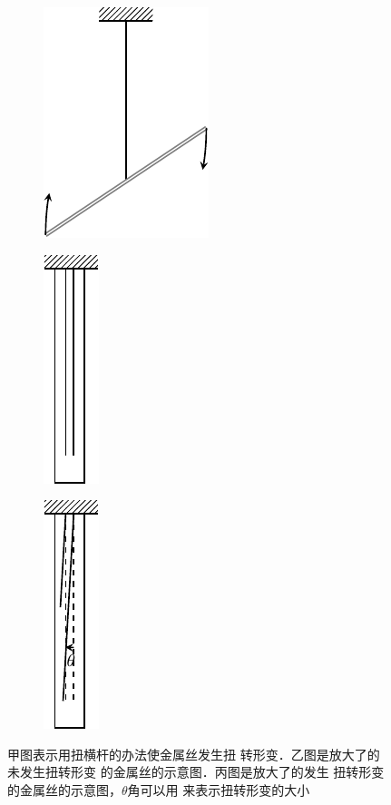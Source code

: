 \begin{figure} [htp]\centering
\begin{subfigure} {0.32\linewidth} 
	\centering
	\includegraphics{fig/A/1-11a.pdf} 
	\caption{} \label{fig_A_1-11a} 
\end{subfigure} 
\hfil
\begin{subfigure} {0.32\linewidth} 
	\centering
	\includegraphics{fig/A/1-11b.pdf} 
	\caption{} \label{fig_A_1-11b} 
\end{subfigure} 
\hfil
\begin{subfigure} {0.32\linewidth} 
	\centering
	\includegraphics{fig/A/1-11c.pdf} 
	\caption{} \label{fig_A_1-11c} 
\end{subfigure} 

\caption{甲图表示用扭横杆的办法使金属丝发生扭
转形变．乙图是放大了的未发生扭转形变
的金属丝的示意图．丙图是放大了的发生
扭转形变的金属丝的示意图，$\theta$角可以用
来表示扭转形变的大小} \label{fig_A_1-11} 
\end{figure} 



